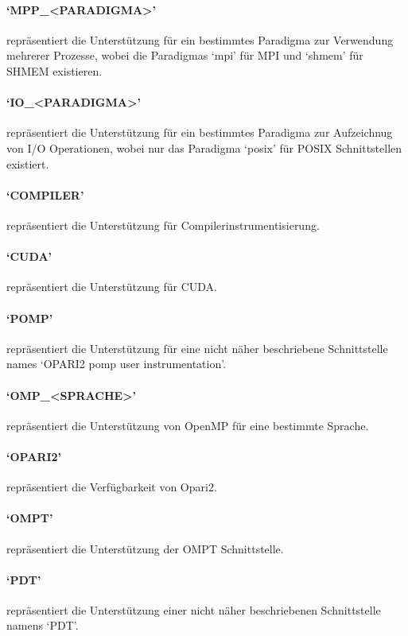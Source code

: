 \documentclass[german,proseminar,hyperref,utf8]{zihpub}
\begin{document}
    \paragraph{`MPP\_<PARADIGMA>'} repräsentiert die Unterstützung für ein bestimmtes Paradigma zur
    Verwendung mehrerer Prozesse, wobei die Paradigmas `mpi' für MPI und `shmem' für SHMEM existieren.

    \paragraph{`IO\_<PARADIGMA>'} repräsentiert die Unterstützung für ein bestimmtes Paradigma zur
    Aufzeichnug von I/O Operationen, wobei nur das Paradigma `posix' für POSIX Schnittstellen existiert.

    \paragraph{`COMPILER'} repräsentiert die Unterstützung für Compilerinstrumentisierung.

    \paragraph{`CUDA'} repräsentiert die Unterstützung für CUDA.
    
    \paragraph{`POMP'} repräsentiert die Unterstützung für eine nicht näher beschriebene Schnittstelle
    names `OPARI2 pomp user instrumentation'.

    \paragraph{`OMP\_<SPRACHE>'} repräsentiert die Unterstützung von OpenMP für eine bestimmte Sprache.

    \paragraph{`OPARI2'} repräsentiert die Verfügbarkeit von Opari2.

    \paragraph{`OMPT'} repräsentiert die Unterstützung der OMPT Schnittstelle.

    \paragraph{`PDT'} repräsentiert die Unterstützung einer nicht näher beschriebenen Schnittstelle
    namens `PDT'.
\end{document}
